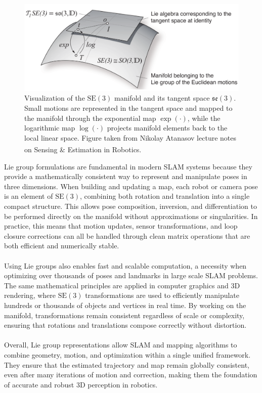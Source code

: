 \begin{figure}[H]
    \centering
    \includegraphics[width=0.8\linewidth]{Pictures/System_Modeling/Orientation_Representations/lie_group_tangent_space.png}
    \caption{Visualization of the $\mathrm{SE}(3)$ manifold and its tangent space $\mathfrak{se}(3)$. Small motions are represented in the tangent space and mapped to the manifold through the exponential map $\exp(\cdot)$, while the logarithmic map $\log(\cdot)$ projects manifold elements back to the local linear space. Figure taken from Nikolay Atanasov lecture notes on Sensing \& Estimation in Robotics.\textsuperscript{\cite{lie_groups_presentation}}}
    \label{fig:system-modeling-so3-se3}
\end{figure}
\noindent
Lie group formulations are fundamental in modern SLAM systems because they provide a mathematically consistent way to represent and manipulate poses in three dimensions. When building and updating a map, each robot or camera pose is an element of $\mathrm{SE}(3)$, combining both rotation and translation into a single compact structure. This allows pose composition, inversion, and differentiation to be performed directly on the manifold without approximations or singularities. In practice, this means that motion updates, sensor transformations, and loop closure corrections can all be handled through clean matrix operations that are both efficient and numerically stable.  
\\ \\
Using Lie groups also enables fast and scalable computation, a necessity when optimizing over thousands of poses and landmarks in large scale SLAM problems. The same mathematical principles are applied in computer graphics and 3D rendering, where $\mathrm{SE}(3)$ transformations are used to efficiently manipulate hundreds or thousands of objects and vertices in real time. By working on the manifold, transformations remain consistent regardless of scale or complexity, ensuring that rotations and translations compose correctly without distortion.  
\\ \\
Overall, Lie group representations allow SLAM and mapping algorithms to combine geometry, motion, and optimization within a single unified framework. They ensure that the estimated trajectory and map remain globally consistent, even after many iterations of motion and correction, making them the foundation of accurate and robust 3D perception in robotics.



